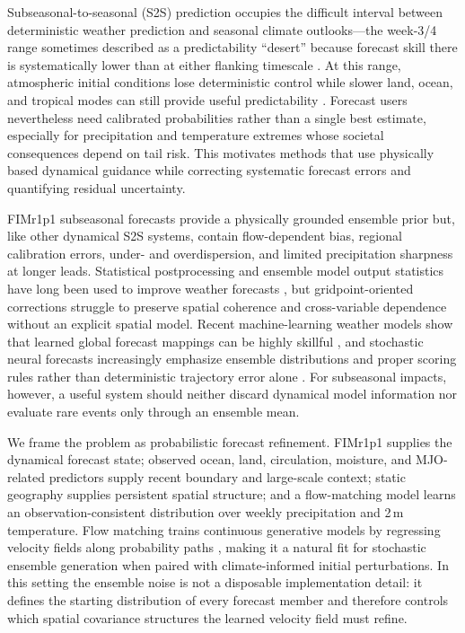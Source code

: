 \documentclass[11pt]{article}
\newcommand{\modelshort}{FIMr1p1}
\begin{document}
Subseasonal-to-seasonal (S2S) prediction occupies the difficult interval between deterministic weather prediction and seasonal climate outlooks---the week-3/4 range sometimes described as a predictability ``desert'' because forecast skill there is systematically lower than at either flanking timescale \citep{Vitart2017}. At this range, atmospheric initial conditions lose deterministic control while slower land, ocean, and tropical modes can still provide useful predictability \citep{Vitart2017,RobertsonVitart2018}. Forecast users nevertheless need calibrated probabilities rather than a single best estimate, especially for precipitation and temperature extremes whose societal consequences depend on tail risk. This motivates methods that use physically based dynamical guidance while correcting systematic forecast errors and quantifying residual uncertainty.

\modelshort{} subseasonal forecasts provide a physically grounded ensemble prior but, like other dynamical S2S systems, contain flow-dependent bias, regional calibration errors, under- and overdispersion, and limited precipitation sharpness at longer leads. Statistical postprocessing and ensemble model output statistics have long been used to improve weather forecasts \citep{Gneiting2005,RaspLerch2018,Gronquist2021}, but gridpoint-oriented corrections struggle to preserve spatial coherence and cross-variable dependence without an explicit spatial model. Recent machine-learning weather models show that learned global forecast mappings can be highly skillful \citep{Bi2023,Lam2023}, and stochastic neural forecasts increasingly emphasize ensemble distributions and proper scoring rules rather than deterministic trajectory error alone \citep{Lang2024}. For subseasonal impacts, however, a useful system should neither discard dynamical model information nor evaluate rare events only through an ensemble mean.

We frame the problem as probabilistic forecast refinement. \modelshort{} supplies the dynamical forecast state; observed ocean, land, circulation, moisture, and MJO-related predictors supply recent boundary and large-scale context; static geography supplies persistent spatial structure; and a flow-matching model learns an observation-consistent distribution over weekly precipitation and 2\,m temperature. Flow matching trains continuous generative models by regressing velocity fields along probability paths \citep{Lipman2023,Liu2023}, making it a natural fit for stochastic ensemble generation when paired with climate-informed initial perturbations. In this setting the ensemble noise is not a disposable implementation detail: it defines the starting distribution of every forecast member and therefore controls which spatial covariance structures the learned velocity field must refine.
\end{document}
